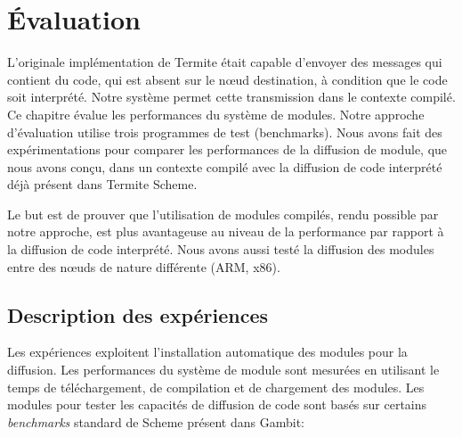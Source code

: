 \def \MMM[#1]{\textit{\normalsize M\footnotesize\raisebox{-0.8ex}{#1}}}

\chapter{Évaluation}

L'originale implémentation de Termite était capable d'envoyer des messages qui
contient du code, qui est absent sur le nœud destination, à condition que le
code soit interprété. Notre système permet cette transmission dans le contexte
compilé.  Ce chapitre évalue les performances du système de modules.  Notre
approche d'évaluation utilise trois programmes de test (benchmarks). Nous avons
fait des expérimentations pour comparer les performances de la diffusion de
module, que nous avons conçu, dans un contexte compilé avec la diffusion de
code interprété déjà présent dans Termite Scheme.

Le but est de prouver que l'utilisation de modules compilés, rendu possible par
notre approche, est plus avantageuse au niveau de la performance par rapport à
la diffusion de code interprété. Nous avons aussi testé la diffusion des modules
entre des nœuds de nature différente (ARM, x86).





\section{Description des expériences}

Les expériences exploitent l'installation automatique des modules pour la
diffusion.  Les performances du système de module sont mesurées en utilisant le
temps de téléchargement, de compilation et de chargement des modules. Les
modules pour tester les capacités de diffusion de code sont basés sur certains
\textit{benchmarks} standard de Scheme présent dans Gambit:


